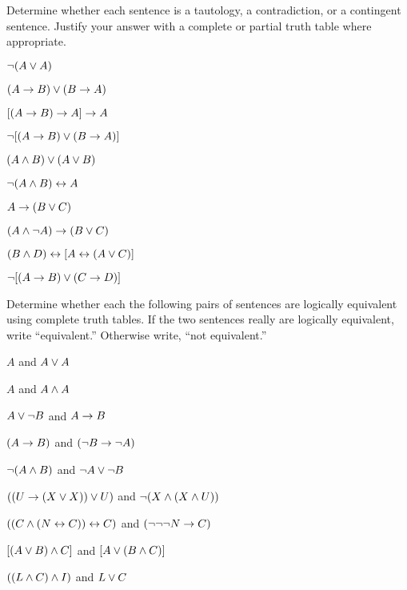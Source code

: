 \noindent\problempart
\label{pr.TT.TTorC}
Determine whether each sentence is a tautology, a contradiction, or a contingent sentence. Justify your answer with a complete or partial truth table where appropriate.
\begin{earg}
\item  $\neg (A \vee A)$\vspace{.5ex}							%
\item $(A \rightarrow B) \vee (B \rightarrow A)$\vspace{.5ex}					%
\item $[(A \rightarrow B) \rightarrow A] \rightarrow A$\vspace{.5ex}					%
\item $\neg[( A \rightarrow B) \vee (B \rightarrow A)]$\vspace{.5ex}			%
\item $(A \wedge B) \vee (A \vee B)$\vspace{.5ex} 				%
\item $\neg(A\wedge B) \leftrightarrow A$\vspace{.5ex} 					%
\item $A\rightarrow(B\vee C)$\vspace{.5ex} 							%
\item $(A \wedge\neg A) \rightarrow (B \vee C)$\vspace{.5ex} 			%
\item $(B\wedge D) \leftrightarrow [A \leftrightarrow(A \vee C)]$\vspace{.5ex}			%
\item $\neg[(A \rightarrow B) \vee (C \rightarrow D)]$\vspace{.5ex} 			%
\end{earg}



\noindent\problempart
Determine whether each the following pairs of sentences are logically equivalent using complete truth tables. If the two sentences really are logically equivalent, write ``equivalent.'' Otherwise write, ``not equivalent.''
\begin{earg}
\item $A$ and $A \vee A$
\item $A$ and $A \wedge A$
\item $A \vee \neg B$ and $A\rightarrow B$
\item $(A \rightarrow B)$ and $(\neg B \rightarrow \neg A)$
\item $\neg(A \wedge B)$ and $\neg A \vee \neg B$
\item $ ((U \rightarrow (X \vee X)) \vee U)$ and $\neg (X \wedge (X \wedge U))$
\item $ ((C \wedge (N \leftrightarrow C)) \leftrightarrow C)$ and $(\neg \neg \neg N \rightarrow C)$
\item $[(A \vee B) \wedge C]$ and $[A \vee (B \wedge C)]$
\item $((L \wedge C) \wedge I)$ and $L \vee C$
\end{earg}


